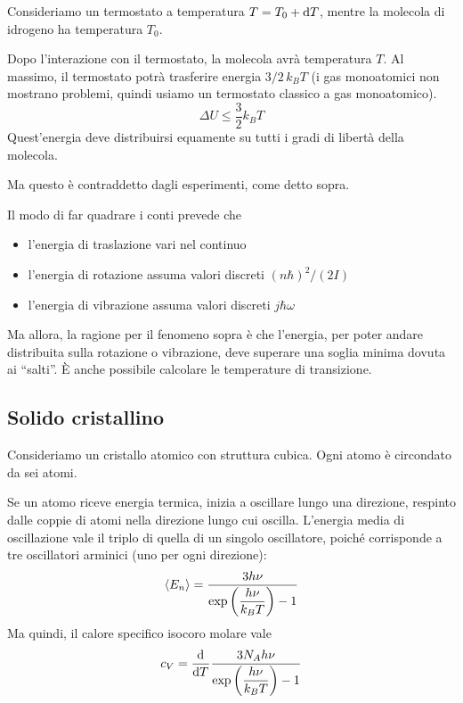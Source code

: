 Consideriamo un termostato a temperatura $T = T_0 + \mathrm{d} T$, mentre la molecola di idrogeno ha temperatura $T_0$.

Dopo l'interazione con il termostato, la molecola avrà temperatura $T$.
Al massimo, il termostato potrà trasferire energia $3/2 \, k_B T$ (i gas monoatomici non mostrano problemi, quindi usiamo un termostato classico a gas monoatomico).
\begin{equation}
    \Delta U \le \frac{3}{2} k_B T
\end{equation}
Quest'energia deve distribuirsi equamente su tutti i gradi di libertà della molecola.

Ma questo è contraddetto dagli esperimenti, come detto sopra.

Il modo di far quadrare i conti prevede che
\begin{itemize}
    \item l'energia di traslazione vari nel continuo
    \item l'energia di rotazione assuma valori discreti $(n \hbar)^2 / (2 I)$
    \item l'energia di vibrazione assuma valori discreti $j \hbar \omega$
\end{itemize}
Ma allora, la ragione per il fenomeno sopra è che l'energia, per poter andare distribuita sulla rotazione o vibrazione, deve superare una soglia minima dovuta ai ``salti''.
È anche possibile calcolare le temperature di transizione.

\subsection{Solido cristallino}

Consideriamo un cristallo atomico con struttura cubica.
Ogni atomo è circondato da sei atomi.

Se un atomo riceve energia termica, inizia a oscillare lungo una direzione, respinto dalle coppie di atomi nella direzione lungo cui oscilla.
L'energia media di oscillazione vale il triplo di quella di un singolo oscillatore, poiché corrisponde a tre oscillatori arminici (uno per ogni direzione):
\begin{equation}
    \left\langle {E_n} \right\rangle = \frac{3 h \nu}{\operatorname{exp}\left( \dfrac{h \nu}{k_B T} \right) - 1}
\end{equation}
Ma quindi, il calore specifico isocoro molare vale
\begin{equation}
    c_V = \der{T} \frac{3 N_A h \nu}{\exp{\dfrac{h \nu}{k_B T}} - 1}
\end{equation}

